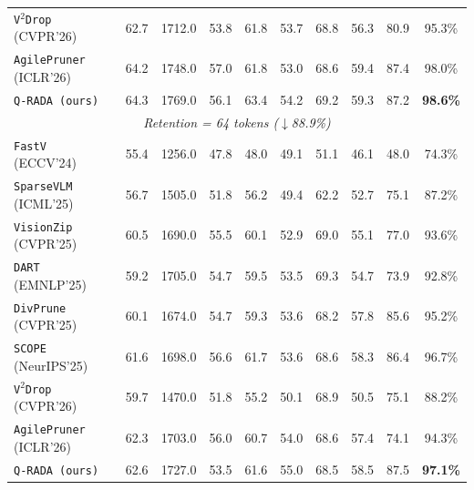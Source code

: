 \begin{table}[t]
\begin{tabular}{l|cccccccc|c}
\texttt{V$^2$Drop} (CVPR'26) & 62.7 & 1712.0 & 53.8 & 61.8 & 53.7 & 68.8 & 56.3 & 80.9 & 95.3\% \\
\texttt{AgilePruner} (ICLR'26) & 64.2 & 1748.0 & 57.0 & 61.8 & 53.0 & 68.6 & 59.4 & 87.4 & 98.0\% \\
\rowcolor{gray!20}\texttt{Q-RADA (ours)} & 64.3 & 1769.0 & 56.1 & 63.4 & 54.2 & 69.2 & 59.3 & 87.2 & \textbf{98.6\%} \\
\midrule
\multicolumn{10}{c}{\textit{Retention = 64 tokens ($\downarrow$88.9\%)}} \\
\midrule
\texttt{FastV} (ECCV'24) & 55.4 & 1256.0 & 47.8 & 48.0 & 49.1 & 51.1 & 46.1 & 48.0 & 74.3\% \\
\texttt{SparseVLM} (ICML'25) & 56.7 & 1505.0 & 51.8 & 56.2 & 49.4 & 62.2 & 52.7 & 75.1 & 87.2\% \\
\texttt{VisionZip} (CVPR'25) & 60.5 & 1690.0 & 55.5 & 60.1 & 52.9 & 69.0 & 55.1 & 77.0 & 93.6\% \\
\texttt{DART} (EMNLP'25) & 59.2 & 1705.0 & 54.7 & 59.5 & 53.5 & 69.3 & 54.7 & 73.9 & 92.8\% \\
\texttt{DivPrune} (CVPR'25) & 60.1 & 1674.0 & 54.7 & 59.3 & 53.6 & 68.2 & 57.8 & 85.6 & 95.2\% \\
\texttt{SCOPE} (NeurIPS'25) & 61.6 & 1698.0 & 56.6 & 61.7 & 53.6 & 68.6 & 58.3 & 86.4 & 96.7\% \\
\texttt{V$^2$Drop} (CVPR'26) & 59.7 & 1470.0 & 51.8 & 55.2 & 50.1 & 68.9 & 50.5 & 75.1 & 88.2\% \\
\texttt{AgilePruner} (ICLR'26) & 62.3 & 1703.0 & 56.0 & 60.7 & 54.0 & 68.6 & 57.4 & 74.1 & 94.3\% \\
\rowcolor{gray!20}\texttt{Q-RADA (ours)} & 62.6 & 1727.0 & 53.5 & 61.6 & 55.0 & 68.5 & 58.5 & 87.5 & \textbf{97.1\%} \\
\bottomrule
\end{tabular}
\end{table}
